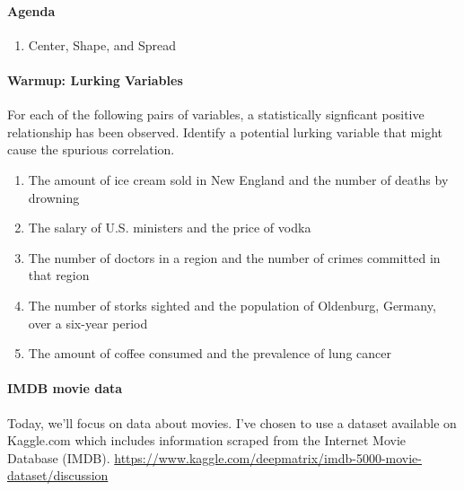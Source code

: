 \documentclass[10pt]{article}\usepackage[]{graphicx}\usepackage[]{color}
\begin{document}
\paragraph{Agenda}
\begin{enumerate}
  \itemsep0em
  \item Center, Shape, and Spread
\end{enumerate}

\paragraph{Warmup: Lurking Variables}

For each of the following pairs of variables, a statistically signficant positive relationship has been observed. Identify a potential lurking variable that might cause the spurious correlation.
\begin{enumerate}
  \itemsep0.5in
  \item The amount of ice cream sold in New England and the number of deaths by drowning
  \item The salary of U.S. ministers and the price of vodka
  \item The number of doctors in a region and the number of crimes committed in that region
  \item The number of storks sighted and the population of Oldenburg, Germany, over a six-year period
  \item The amount of coffee consumed and the prevalence of lung cancer
\end{enumerate}


\paragraph{IMDB movie data}
Today, we'll focus on data about movies. I've chosen to use a dataset available on Kaggle.com which includes information scraped from the Internet Movie Database (IMDB). \url{https://www.kaggle.com/deepmatrix/imdb-5000-movie-dataset/discussion}
\end{document}
